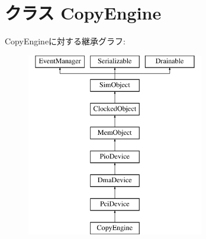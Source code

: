 \hypertarget{classCopyEngine_1_1CopyEngine}{
\section{クラス CopyEngine}
\label{classCopyEngine_1_1CopyEngine}
}
CopyEngineに対する継承グラフ:\begin{figure}[H]
\begin{center}
\leavevmode
\includegraphics[height=8cm]{classCopyEngine_1_1CopyEngine}
\end{center}
\end{figure}
